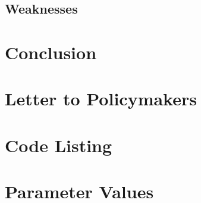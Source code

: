 \documentclass[11pt,letterpaper]{article}
\begin{document}
\subsection{Weaknesses}

\section{Conclusion}




\newpage
\section*{Letter to Policymakers}


\appendix
\section{Code Listing}


\section{Parameter Values}

\end{document}
